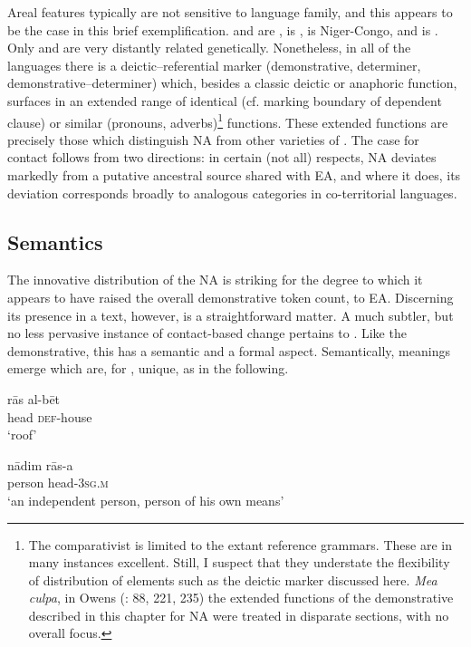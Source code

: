 \documentclass[output=paper]{langsci/langscibook}
\begin{document}
Areal features typically are not sensitive to language family, and this appears to be the case in this brief exemplification.  and  are ,  is ,  is Niger-Congo, and  is . Only  and  are very distantly related genetically. Nonetheless, in all of the languages there is a deictic–referential marker (demonstrative, determiner, demonstrative–determiner) which, besides a classic deictic or anaphoric function, surfaces in an extended range of identical (cf. marking boundary of dependent clause) or similar (pronouns, adverbs)\footnote{The comparativist is limited to the extant reference grammars. These are in many instances excellent. Still, I suspect that they understate the flexibility of distribution of elements such as the deictic marker discussed here. \textit{Mea culpa}, in Owens (\citeyear{Owens1993}: 88, 221, 235) the extended functions of the demonstrative described in this chapter for NA were treated in disparate sections, with no overall focus.} functions. These extended functions are precisely those which distinguish NA from other varieties of . The case for contact follows from two directions: in certain (not all) respects, NA deviates markedly from a putative ancestral source shared with EA, and where it does, its deviation corresponds broadly to analogous categories in co-territorial languages.

\subsection{Semantics}

The innovative distribution of the NA  is striking for the degree to which it appears to have raised the overall demonstrative token count,  to EA. Discerning its presence in a text, however, is a straightforward matter. A much subtler, but no less pervasive instance of contact-based change pertains to . Like the demonstrative, this has a semantic and a formal aspect. Semantically, meanings emerge which are, for , unique, as in the following.

\ea\label{bet}
\ea
\gll rās al-bēt\\
     head \textsc{def-}house\\
\glt ‘roof’\label{roof}

\ex
\gll nādim rās-a\\
     person head-\textsc{3sg.m}\\
\glt ‘an independent person, person of his own means’\label{nadim}
\z
\z
\end{document}
